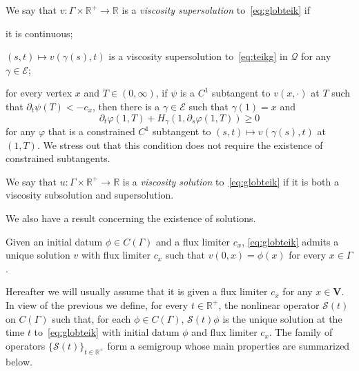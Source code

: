 \documentclass[11pt,a4paper,american]{article}
\newcommand{\Ecal}{\mathcal E}
\newcommand{\Qcal}{\mathcal Q}
\newcommand{\Rds}{\mathds R}
\newcommand{\Scal}{\mathcal S}
\newcommand{\Vbf}{\mathbf V}
\begin{document}
    \begin{defin}\label{deftsupsol}
        We say that $v:\Gamma\times\Rds^+\to\Rds$ is a \emph{viscosity supersolution} to~\cref{eq:globteik} if
        \begin{myenum}
            \item it is continuous;
            \item\label{loctsupsol} $(s,t)\mapsto v(\gamma(s),t)$ is a viscosity supersolution to~\cref{eq:teikg} in $\Qcal$ for any $\gamma\in\Ecal$;
            \item\label{tstateconst} for every vertex $x$ and $T\in(0,\infty)$, if $\psi$ is a $C^1$ subtangent to $v(x,\cdot)$ at $T$ such that $\partial_t\psi(T)<-c_x$, then there is a $\gamma\in\Ecal$ such that $\gamma(1)=x$ and
            \begin{equation*}
                \partial_t\varphi(1,T)+H_\gamma(1,\partial_s\varphi(1,T))\ge0
            \end{equation*}
            for any $\varphi$ that is a constrained $C^1$ subtangent to $(s,t)\mapsto v(\gamma(s),t)$ at $(1,T)$. We stress out that this condition does not require the existence of constrained subtangents.
        \end{myenum}
        We say that $u:\Gamma\times\Rds^+\to\Rds$ is a \emph{viscosity solution} to~\cref{eq:globteik} if it is both a viscosity subsolution and supersolution.
    \end{defin}

    We also have a result concerning the existence of solutions.

    \begin{theo}\label{exunsolt}
        \emph{\cite[Theorem 6.7]{PozzaSiconolfi23}} Given an initial datum $\phi\in C(\Gamma)$ and a flux limiter $c_x$, \cref{eq:globteik} admits a unique solution $v$ with flux limiter $c_x$ such that $v(0,x)=\phi(x)$ for every $x\in\Gamma$.
    \end{theo}

    Hereafter we will usually assume that it is given a flux limiter $c_x$ for any $x\in\Vbf$. In view of the previous  we define, for every $t\in\Rds^+$, the nonlinear operator $\Scal(t)$ on $C(\Gamma)$ such that, for each $\phi\in C(\Gamma)$, $\Scal(t)\phi$ is the unique solution at the time $t$ to~\cref{eq:globteik} with initial datum $\phi$ and flux limiter $c_x$. The family of operators $\{\Scal(t)\}_{t\in\Rds^+}$ form a semigroup whose main properties are summarized below.
\end{document}
